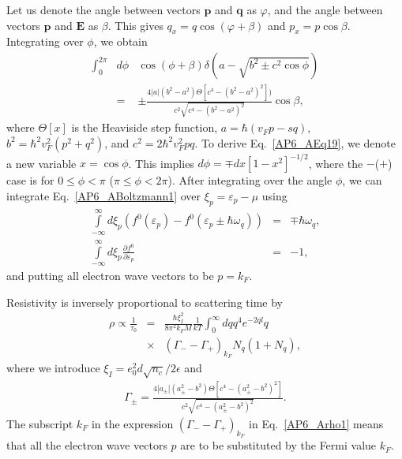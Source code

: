 Let us denote the angle between vectors $\textbf{p}$ and $\textbf{q}$ as $\varphi$, and the angle between vectors $\textbf{p}$ and $\textbf{E}$ as $\beta$. This gives $q_x=q\cos(\varphi+\beta)$ and $p_x=p\cos\beta$. Integrating over $\phi$, we obtain
%
\begin{eqnarray}
\label{AP6_AEq19}
\int_0^{2\pi} &d\phi&\cos (\phi+\beta)\delta(a-\sqrt{b^2\pm c^2\cos\phi})\\\nonumber
&=&\pm\frac{4|a|(b^2-a^2)\Theta[c^4-(b^2-a^2)^2])}{c^2\sqrt{c^4-(b^2-a^2)^2}}\cos\beta,
\end{eqnarray}
%
where $\Theta[x]$ is the Heaviside step function, $a=\hbar(v_Fp-sq)$, $b^2=\hbar^2v_F^2(p^2+q^2)$, and $c^2=2\hbar^2 v_F^2pq$. 
To derive Eq.~\eqref{AP6_AEq19}, we denote a new variable $x=\cos\phi$. This implies $d\phi=\mp dx[1-x^2]^{-1/2}$, where the $-$($+$) case is for $0\leq\phi <\pi$ ($\pi\leq\phi<2\pi$).
%
After integrating over the angle $\phi$, we can integrate Eq.~\eqref{AP6_ABoltzmann1} over $\xi_p=\varepsilon_p-\mu$ using
%
\begin{eqnarray}
\int\limits_{-\infty}^{\infty}d\xi_p\left(f^0(\varepsilon_p)-f^0(\varepsilon_{p}\pm\hbar\omega_q)\right)&=&\mp\hbar\omega_q,\nonumber \\
\int\limits_{-\infty}^{\infty}d\xi_p\frac{\partial f^0}{\partial \varepsilon_p}&=&-1,
\end{eqnarray}
%
and putting all electron wave vectors to be $p=k_F$.

Resistivity is inversely proportional to scattering time by
%
\begin{eqnarray}
\label{AP6_Arho1}
\rho\propto\frac{1}{\tau_0}&=&\frac{\hbar\xi_I^2}{8\pi^2k_FM}\frac{1}{kT}\int_0^\infty dq q^4e^{-2ql}q\nonumber\\
&\times&(\Gamma_--\Gamma_+)_{k_F}N_q(1+N_q),
\end{eqnarray}
%
where we introduce $\xi_I= e_0^2d\sqrt{n_c}/2\epsilon$ and
%
\begin{eqnarray}
\label{AP6_Agamma}
\Gamma_{\pm}=\frac{4|a_{\pm}|(a^2_{\pm}-b^2)\Theta[c^4-(a^2_{\pm}-b^2)^2]}{c^2\sqrt{c^4-(a^2_\pm-b^2)^2}}.
\end{eqnarray}
%
The subscript $k_F$ in the expression $(\Gamma_--\Gamma_+)_{k_F}$ in Eq.~\eqref{AP6_Arho1} means that all the electron wave vectors $p$ are to be substituted by the Fermi value $k_F$.
%

